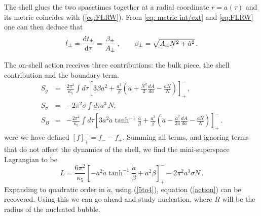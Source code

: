 The shell glues the two spacetimes together at a radial coordinate $r=a(\tau)$ and its metric coincides with (\ref{eq:FLRW}).
From \eqref{eq: metric int/ext} and \eqref{eq:FLRW} one can then deduce that
\begin{equation}
\dot{t}_{\pm}=\frac{\text{d} t_{\pm}}{\text{d} \tau} = \frac{\beta_{\pm}}{A_{\pm}}\,,\qquad \beta_{\pm} = \sqrt{A_{\pm}N^2+\dot{a}^2}\,.
\end{equation}


The on-shell action receives three contributions: the bulk piece, the shell contribution and the boundary term.
\begin{eqnarray}
S_g & = & \frac{2\pi^2}{\kappa_5} \int d\tau \left[3 \beta a^2 + \frac{a^3}{\beta}\left(\ddot{a}+\frac{N^2}{2}\frac{dA}{da}-\frac{\dot{a}\dot{N}}{N}\right)\right]_+^- \,,\nonumber\\
S_{\sigma} & = & -2\pi^2 \sigma \int d\tau a^3\, N,\\
S_B & = & -\frac{2\pi^2}{\kappa_5} \int d\tau \left[3 a^2 \dot{a} \tanh ^{-1}\frac{\dot{a}}{\beta} + \frac{a^3}{\beta}\left(\ddot{a}-\frac{\dot{a}^2}{2a}\frac{dA}{da}-\frac{\dot{a}\dot{N}}{N}\right)\right]_+^-  \,.\nonumber
\end{eqnarray}
were we have defined $\left[ f \right]_+^- = f_- - f_+$. 
Summing all terms, and ignoring terms that do not affect the dynamics of the shell, we find the mini-superspace Lagrangian to be
\begin{equation}
L=\frac{6\pi^2}{\kappa_5} \left[-a^2 \dot{a} \tanh^{-1} \frac{\dot{a}}{\beta} + a^2 \beta \right]_+^- -2\pi^2 a^3 \sigma N\,.
\end{equation}
Expanding to quadratic order in $\dot{a}$, using (\ref{5to4}), equation (\ref{action}) can be recovered. Using this we can go ahead and study nucleation, where $R$ will be the radius of the nucleated bubble. 

